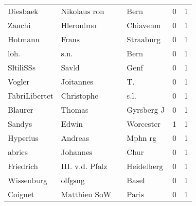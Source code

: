 \begin{center}
\begin{tiny}
\begin{longtabu}{llllrr}
                 Diesbaek &                       Nikolaus ron &             &                                        Bern &          0 &         1 \\
                   Zanchi &                          Hleronlmo &             &                                    Chiavenm &          0 &         1 \\
                  Hotmann &                              Frans &             &                                   Straaburg &          0 &         1 \\
                     loh. &                               s.n. &             &                                        Bern &          0 &         1 \\
                SltiliSSs &                              Savld &             &                                        Genf &          0 &         1 \\
                   Vogler &                          Joitannes &             &                                         T.  &          0 &         1 \\
            FabriLibertet &                         Christophe &             &                                        s.l. &          0 &         1 \\
                  Blaurer &                             Thomas &             &                                  Gyrsberg J &          0 &         1 \\
                   Sandys &                              Edwin &             &                                   Worcester &          1 &         1 \\
                 Hyperius &                            Andreas &             &                                     Mphn rg &          0 &         1 \\
                   abrics &                           Johannes &             &                                        Chur &          0 &         1 \\
                Friedrich &                    III. v.d. Pfalz &             &                                  Heidelberg &          0 &         1 \\
               Wissenburg &                            olfgsng &             &                                       Basel &          0 &         1 \\
                  Coignet &                       Matthieu SoW &             &                                       Paris &          0 &         1 \\

\end{longtabu}
\end{tiny}
\end{center}
